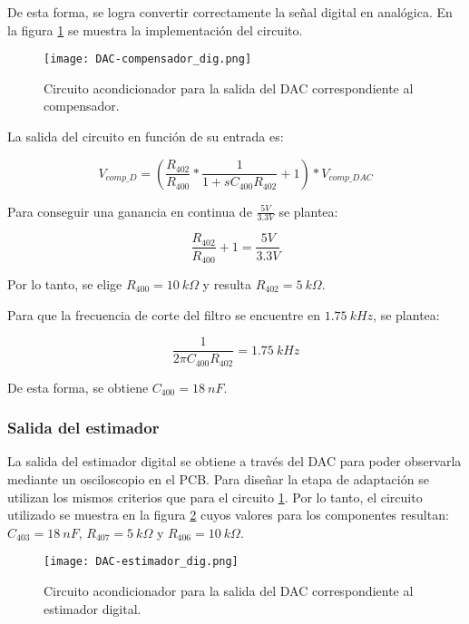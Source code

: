 De esta forma, se logra convertir correctamente la señal digital en analógica. En la figura \ref{fig:DAC-compensador} se muestra la implementación del circuito.

\begin{figure}[H]
	\centering
	\texttt{[image: DAC-compensador\_dig.png]}
	\caption{Circuito acondicionador para la salida del DAC correspondiente al compensador.}
	\label{fig:DAC-compensador}
\end{figure}

La salida del circuito en función de su entrada es:

\begin{equation*} 
	V_{comp\_D}=(\frac{R_{402}}{R_{400}} *\frac{1}{1+sC_{400}R_{402}}+1)*V_{comp\_DAC}
\end{equation*}

Para conseguir una ganancia en continua de  $\frac{5V}{3.3V}$ se plantea:

\begin{equation*} 
	\frac{R_{402}}{R_{400}} +1 = \frac{5V}{3.3V}
\end{equation*}

Por lo tanto, se elige $R_{400}=10\:k\Omega$ y resulta $R_{402}=5\:k\Omega$. 

Para que la frecuencia de corte del filtro se encuentre en $1.75\:kHz$, se plantea:

\begin{equation*} 
	\frac{1}{2\pi C_{400}R_{402}}=1.75\:kHz
\end{equation*}

De esta forma, se obtiene $C_{400}=18\:nF$. 


\subsubsection{Salida del estimador}

La salida del estimador digital se obtiene a través del DAC para poder observarla mediante un osciloscopio en el PCB. Para diseñar la etapa de adaptación se utilizan los mismos criterios que para el circuito \ref{fig:DAC-compensador}. Por lo tanto, el circuito utilizado se muestra en la figura \ref{fig:DAC-estimador} cuyos valores para los componentes resultan: $C_{403}=18\:nF$, $R_{407}=5\:k\Omega$ y $R_{406}=10\:k\Omega$.

\begin{figure}[H]
	\centering
	\texttt{[image: DAC-estimador\_dig.png]}
	\caption{Circuito acondicionador para la salida del DAC correspondiente al estimador digital.}
	\label{fig:DAC-estimador}
\end{figure}


